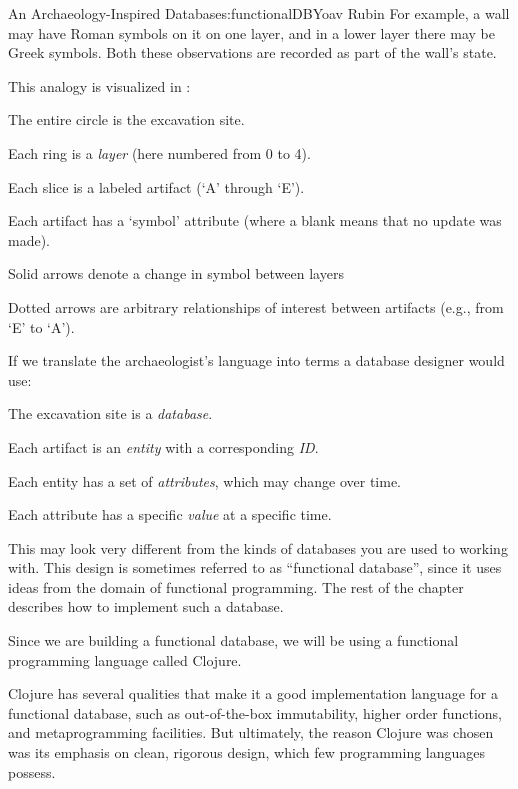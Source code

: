 \begin{aosachapter}{An Archaeology-Inspired Database}{s:functionalDB}{Yoav Rubin}
For example, a wall may have Roman symbols on it on one layer, and in a
lower layer there may be Greek symbols. Both these observations are
recorded as part of the wall's state.

This analogy is visualized in :

\begin{aosaitemize}

\item
  The entire circle is the excavation site.
\item
  Each ring is a \emph{layer} (here numbered from 0 to 4).
\item
  Each slice is a labeled artifact (`A' through `E').
\item
  Each artifact has a `symbol' attribute (where a blank means that no
  update was made).
\item
  Solid arrows denote a change in symbol between layers
\item
  Dotted arrows are arbitrary relationships of interest between
  artifacts (e.g., from `E' to `A').
\end{aosaitemize}


If we translate the archaeologist's language into terms a database
designer would use:

\begin{aosaitemize}

\item
  The excavation site is a \emph{database}.
\item
  Each artifact is an \emph{entity} with a corresponding \emph{ID}.
\item
  Each entity has a set of \emph{attributes}, which may change over
  time.
\item
  Each attribute has a specific \emph{value} at a specific time.
\end{aosaitemize}

This may look very different from the kinds of databases you are used to
working with. This design is sometimes referred to as ``functional
database'', since it uses ideas from the domain of functional
programming. The rest of the chapter describes how to implement such a
database.

Since we are building a functional database, we will be using a
functional programming language called Clojure.

Clojure has several qualities that make it a good implementation
language for a functional database, such as out-of-the-box immutability,
higher order functions, and metaprogramming facilities. But ultimately,
the reason Clojure was chosen was its emphasis on clean, rigorous
design, which few programming languages possess.


\end{aosachapter}
